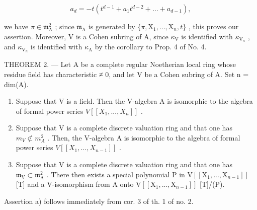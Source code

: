 \[
a _ {d} = - t \left(t ^ {d - 1} + a _ {1} t ^ {d - 2} + \dots + a _ {d - 1}\right),
\]

we have \(\pi\in\mathfrak{m}_{\mathrm{A}}^{2}\) ; since \(\mathfrak{m}_{\mathrm{A}}\) is generated by \(\{\pi,\mathrm{X}_{1},..., \mathrm{X}_{n},t\}\) , this proves our assertion. Moreover, V is a Cohen subring of A, since \(\kappa_{\mathrm{V}}\) is identified with \(\kappa_{\mathrm{V}_{n}}\) , and \(\kappa_{\mathrm{V}_{n}}\) is identified with \(\kappa_{\mathrm{A}}\) by the corollary to Prop. 4 of No. 4.

THEOREM 2. --- Let A be a complete regular Noetherian local ring whose residue field has characteristic ≠ 0, and let V be a Cohen subring of A. Set n = dim(A).

\begin{enumerate}
\def\labelenumi{\alph{enumi})}
\item
  Suppose that V is a field. Then the V-algebra A is isomorphic to the algebra of formal power series \(V[[X_{1}, ..., X_{n}]]\) .
\item
  Suppose that V is a complete discrete valuation ring and that one has \(m_{V} \not\subset m_{A}^{2}\) . Then, the V-algebra A is isomorphic to the algebra of formal power series \(V[[X_{1}, ..., X_{n-1}]]\) .
\item
  Suppose that V is a complete discrete valuation ring and that one has \(\mathfrak{m}_{\mathrm{V}} \subset \mathfrak{m}_{\mathrm{A}}^{2}\) . There then exists a special polynomial P in \(\mathrm{V}[[\mathrm{X}_{1}, ..., \mathrm{X}_{n-1}]]\) {[}T{]} and a V-isomorphism from A onto \(\mathrm{V}[[\mathrm{X}_{1}, ..., \mathrm{X}_{n-1}]]\) {[}T{]}/(P).
\end{enumerate}

Assertion a) follows immediately from cor. 3 of th. 1 of no. 2.

